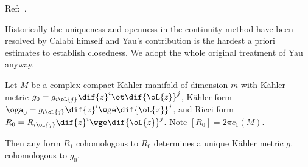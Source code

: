 \documentclass[article, a4paper, twoside]{universal}
\begin{document}
\confighead{}{}{}


Ref:~\cite{Yau1978}.

Historically the uniqueness and openness in the continuity method have been resolved by Calabi himself and Yau's contribution is the hardest a priori estimates to establish closedness. We adopt the whole original treatment of Yau anyway.

\begin{thm}
	Let $M$ be a complex compact K{\"a}hler manifold of dimension $m$ with K{\"a}hler metric $g_{0}=g_{i\oL{j}}\dif{z}^{i}\ot\dif{\oL{z}}^{j}$, K{\"a}hler form $\oga_{0}=g_{i\oL{j}}\dif{z}^{i}\wge\dif{\oL{z}}^{j}$, and Ricci form $R_{0}=R_{i\oL{j}}\dif{z}^{i}\wge\dif{\oL{z}}^{j}$. Note $[R_{0}]=2\pi c_{1}(M)$.

	Then any form $R_{1}$ cohomologous to $R_{0}$ determines a unique K{\"a}hler metric $g_{1}$ cohomologous to $g_{0}$.
\end{thm}
\end{document}
